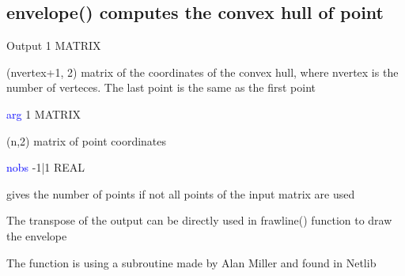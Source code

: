 \subsection{\textcolor{VioletRed}{envelope}() computes the convex hull of point}
\label{envelope}
\vspace{0.3cm}
\hline
\vspace{0.3cm}
\noindent Output \tabto{3cm}  1 \tabto{5cm}  MATRIX  \tabto{7cm}
\begin{changemargin}{3cm}{0cm}
\noindent  (nvertex+1, 2) matrix of the coordinates of the convex hull, where nvertex is the number of
verteces. The last point is the same as the first point
\end{changemargin}
\vspace{0.3cm}
\hline
\vspace{0.3cm}
\noindent \textcolor{blue}{arg}  \tabto{3cm} 1 \tabto{5cm}  MATRIX  \tabto{7cm}
\begin{changemargin}{3cm}{0cm}
\noindent  (n,2) matrix of point coordinates
\end{changemargin}
\vspace{0.3cm}
\hline
\vspace{0.3cm}
\noindent \textcolor{blue}{nobs} \tabto{3cm} -1|1 \tabto{5cm}   REAL \tabto{7cm}
\begin{changemargin}{3cm}{0cm}
\noindent  gives the number of points if not all
points of the input matrix are used
\end {changemargin}
\hline
\vspace{0.2cm}
\begin{note}
The transpose of the output can be directly used in frawline() function
to draw the envelope
\end{note}
\begin{note}
The function is using a subroutine made by Alan Miller and found in Netlib
\end{note}
